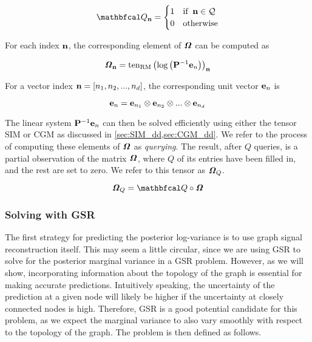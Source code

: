 \begin{equation}
    \Qt_{\nn} = \begin{cases}
        1 & \text{if} \;\; \nn \in \mathcal{Q} \\
        0 & \text{otherwise}
    \end{cases}
\end{equation}


For each index $\mathbf{n}$, the corresponding element of $\bm{\mathit{\Omega}}$ can be computed as 

\begin{equation}
    \bm{\mathit{\Omega}}_{\mathbf{n}} = \text{\textup{ten}}_{\text{\textup{RM}}}\left(\log \left( \mathbf{P}^{-1} \mathbf{e}_n \right)\right)_{\mathbf{n}}
\end{equation}

For a vector index $\mathbf{n} = [n_1, n_2, ..., n_d]$, the corresponding unit vector $\mathbf{e}_n$ is 

\begin{equation}
\mathbf{e}_n = \mathbf{e}_{n_1} \otimes \mathbf{e}_{n_2} \otimes ... \otimes \mathbf{e}_{n_d}
\end{equation}

The linear system $\mathbf{P}^{-1} \mathbf{e}_n$ can then be solved efficiently using either the tensor SIM or CGM as discussed in \cref{sec:SIM_dd,sec:CGM_dd}. We refer to the process of computing these elements of $\bm{\mathit{\Omega}}$ as \textit{querying}. The result, after $Q$ queries, is a partial observation of the matrix $\bm{\mathit{\Omega}}$, where $Q$ of its entries have been filled in, and the rest are set to zero. We refer to this tensor as $\bm{\mathit{\Omega}}_Q$. 


\begin{equation}
    \Omegat_Q = \Qt \circ \Omegat
\end{equation}


\subsubsection{Solving with GSR}

The first strategy for predicting the posterior log-variance is to use graph signal reconstruction itself. This may seem a little circular, since we are using GSR to solve for the posterior marginal variance in a GSR problem. However, as we will show, incorporating information about the topology of the graph is essential for making accurate predictions. Intuitively speaking, the uncertainty of the prediction at a given node will likely be higher if the uncertainty at closely connected nodes is high. Therefore, GSR is a good potential candidate for this problem, as we expect the marginal variance to also vary smoothly with respect to the topology of the graph. The problem is then defined as follows. 

